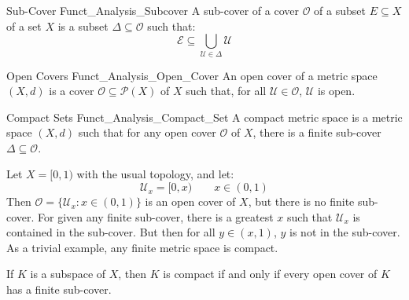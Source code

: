         \begin{ldefinition}{Sub-Cover}
              {Funct_Analysis_Subcover}
            A sub-cover of a cover $\mathcal{O}$ of a subset
            $E\subseteq{X}$ of a set $X$ is a subset
            $\Delta\subseteq\mathcal{O}$ such that:
          \begin{equation}
                \mathcal{E}\subseteq
                \bigcup_{\mathcal{U}\in\Delta}
                    \mathcal{U}
            \end{equation}
        \end{ldefinition}
        \begin{ldefinition}{Open Covers}
              {Funct_Analysis_Open_Cover}
            An open cover of a metric space $(X,d)$ is a cover
            $\mathcal{O}\subseteq\mathcal{P}(X)$ of $X$ such
            that, for all $\mathcal{U}\in\mathcal{O}$,
            $\mathcal{U}$ is open.
        \end{ldefinition}
        \begin{ldefinition}{Compact Sets}
              {Funct_Analysis_Compact_Set}
            A compact metric space is a metric space $(X,d)$
            such that for any open cover $\mathcal{O}$ of
            $X$, there is a finite
            sub-cover $\Delta\subseteq\mathcal{O}$.
        \end{ldefinition}
        \begin{lexample}
            Let $X=[0,1)$ with the usual topology, and let:
            \begin{equation}
                \mathcal{U}_{x}=[0,x)
                \quad\quad
                x\in(0,1)
            \end{equation}
            Then $\mathcal{O}=\{\mathcal{U}_{x}:x\in(0,1)\}$
            is an open cover of $X$, but there is no finite
            sub-cover. For given any finite sub-cover,
            there is a greatest $x$ such that
            $\mathcal{U}_{x}$ is contained in the sub-cover.
            But then for all $y\in(x,1)$, $y$ is not in
            the sub-cover. As a trivial example, any
            finite metric space is compact.
        \end{lexample}
        \begin{theorem}
            If $K$ is a subspace of $X$, then $K$ is compact
            if and only if every open cover of $K$ has a
            finite sub-cover.
        \end{theorem}
